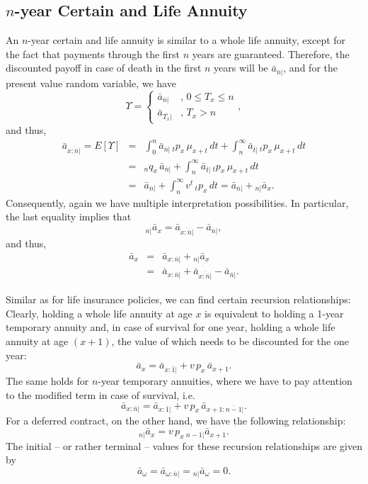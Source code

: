 \documentclass[11pt,fleqn,oneside]{book}
\begin{document}
\subsection*{$n$-year Certain and Life Annuity}
An $n$-year certain and life annuity is similar to a whole life annuity, except for the fact that payments through the first $n$ years are guaranteed. Therefore, the discounted payoff in case of death in the first $n$ years will be $\bar{a}_{\overline{n}|}$, and for the present value random variable, we have
$$
\Upsilon =\left\{ \begin{array}{cl}
\bar{a}_{\overline{n}|}&,\, 0\leq T_x \leq n\\
\bar{a}_{\overline{T_x}|}&,\,T_x > n
\end{array}\right.,
$$
and thus,
\begin{eqnarray*}
\bar{a}_{\overline{x:\overline{n}|}} = E[\Upsilon] &=& \int_0^n \bar{a}_{\overline{n}|}\,{_tp_x}\,\mu_{x+t}\,dt 
+ \int_n^{\infty} \bar{a}_{\overline{t}|}\,{_tp_x}\,\mu_{x+t}\,dt \\
&=& {_nq_x}\,{\bar{a}_{\overline{n}|}} + \int_n^{\infty} \bar{a}_{\overline{t}|}\,{_tp_x}\,\mu_{x+t}\,dt \\
&=& {\bar{a}_{\overline{n}|}} + \int_n^{\infty} v^t\,{_tp_x}\,dt =  {\bar{a}_{\overline{n}|}} + {_{n|}\bar{a}_x}. 
\end{eqnarray*}
Consequently, again we have multiple interpretation possibilities. In particular, the last equality implies that
$$
 {_{n|}\bar{a}_x} = \bar{a}_{\overline{x:\overline{n}|}} - {\bar{a}_{\overline{n}|}}, 
$$
and thus,
\begin{eqnarray*}
\bar{a}_x &=& \bar{a}_{x:\overline{n}|} +  {_{n|}\bar{a}_x}  \\
&=&  \bar{a}_{x:\overline{n}|} +  \bar{a}_{\overline{x:\overline{n}|}} - {\bar{a}_{\overline{n}|}}.
\end{eqnarray*}

Similar as for life insurance policies, we can find certain recursion relationships: Clearly, holding a whole life annuity at age $x$ is equivalent to holding a 1-year temporary annuity and, in case of survival for one year, holding a whole life annuity at age $(x+1)$, the value of which needs to be discounted for the one year:
$$
\bar{a}_x = \bar{a}_{x:\overline{1}|} + v\,p_x\,\bar{a}_{x+1}.
$$
The same holds for $n$-year temporary annuities, where we have to pay attention to the modified term in case of survival, i.e.
$$
\bar{a}_{x:\overline{n}|} = \bar{a}_{x:\overline{1}|} + v\,p_x\,\bar{a}_{x+1:\overline{n-1}|}.
$$
For a deferred contract, on the other hand, we have the following relationship:
$$
{_{n|}\bar{a}_x} = v\,p_x\,{_{n-1|}\bar{a}_{x+1}}.
$$
The initial -- or rather terminal -- values for these recursion relationships are given by 
$$
\bar{a}_{\omega} = \bar{a}_{\omega:\overline{n}|} = {_{n|}\bar{a}_{\omega}}  = 0.
$$
\end{document}
